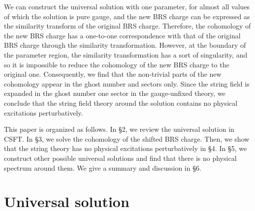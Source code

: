 \documentclass[a4paper,seceq,preprint]{ptptex}
\begin{document}
We can construct the universal solution with one parameter, for 
almost all values of which the solution is pure gauge, and the
new BRS charge can be expressed as the similarity transform of the
original BRS charge. Therefore, the cohomology of the new BRS charge has
a one-to-one correspondence with that of the original BRS charge
through the similarity transformation. However, at the boundary of the
parameter region, the similarity transformation has a sort of
singularity, and so it is impossible to reduce the cohomology of the new
BRS charge to the original one.
Consequently, we find that the non-trivial parts of the
new cohomology appear in the ghost number \coordHE{} and \coordHE{} sectors only.  
Since the string field
is expanded in the ghost number one sector
in the gauge-unfixed theory, we conclude that the string field
theory around the solution contains no physical excitations
perturbatively.

This paper is organized as follows. In \S 2, we review the
universal solution in CSFT. In \S 3, we solve the cohomology of the
shifted BRS charge. Then, we show that the string theory has no physical
excitations perturbatively in \S 4.
In \S 5, we construct other possible universal solutions and find
that there is no physical spectrum around them.
We give a summary and discussion in \S 6.



\section{Universal solution}
\end{document}
